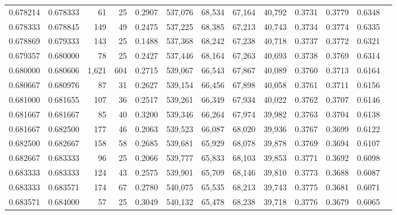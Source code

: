 \begin{tabular}{rrrrrrrrrrrrr}
0.678214 & 0.678333 &    61 &  25 &                                     0.2907 & 537,076 &  68,534 &  67,164 &  40,792 & 0.3731 & 0.3779 & 0.6348 \\
0.678333 & 0.678845 &   149 &  49 &                                     0.2475 & 537,225 &  68,385 &  67,213 &  40,743 & 0.3734 & 0.3774 & 0.6335 \\
0.678869 & 0.679333 &   143 &  25 &                                     0.1488 & 537,368 &  68,242 &  67,238 &  40,718 & 0.3737 & 0.3772 & 0.6321 \\
0.679357 & 0.680000 &    78 &  25 &                                     0.2427 & 537,446 &  68,164 &  67,263 &  40,693 & 0.3738 & 0.3769 & 0.6314 \\
0.680000 & 0.680606 & 1,621 & 604 &                                     0.2715 & 539,067 &  66,543 &  67,867 &  40,089 & 0.3760 & 0.3713 & 0.6164 \\
0.680667 & 0.680976 &    87 &  31 &                                     0.2627 & 539,154 &  66,456 &  67,898 &  40,058 & 0.3761 & 0.3711 & 0.6156 \\
0.681000 & 0.681655 &   107 &  36 &                                     0.2517 & 539,261 &  66,349 &  67,934 &  40,022 & 0.3762 & 0.3707 & 0.6146 \\
0.681667 & 0.681667 &    85 &  40 &                                     0.3200 & 539,346 &  66,264 &  67,974 &  39,982 & 0.3763 & 0.3704 & 0.6138 \\
0.681667 & 0.682500 &   177 &  46 &                                     0.2063 & 539,523 &  66,087 &  68,020 &  39,936 & 0.3767 & 0.3699 & 0.6122 \\
0.682500 & 0.682667 &   158 &  58 &                                     0.2685 & 539,681 &  65,929 &  68,078 &  39,878 & 0.3769 & 0.3694 & 0.6107 \\
0.682667 & 0.683333 &    96 &  25 &                                     0.2066 & 539,777 &  65,833 &  68,103 &  39,853 & 0.3771 & 0.3692 & 0.6098 \\
0.683333 & 0.683333 &   124 &  43 &                                     0.2575 & 539,901 &  65,709 &  68,146 &  39,810 & 0.3773 & 0.3688 & 0.6087 \\
0.683333 & 0.683571 &   174 &  67 &                                     0.2780 & 540,075 &  65,535 &  68,213 &  39,743 & 0.3775 & 0.3681 & 0.6071 \\
0.683571 & 0.684000 &    57 &  25 &                                     0.3049 & 540,132 &  65,478 &  68,238 &  39,718 & 0.3776 & 0.3679 & 0.6065 \\

\end{tabular}
